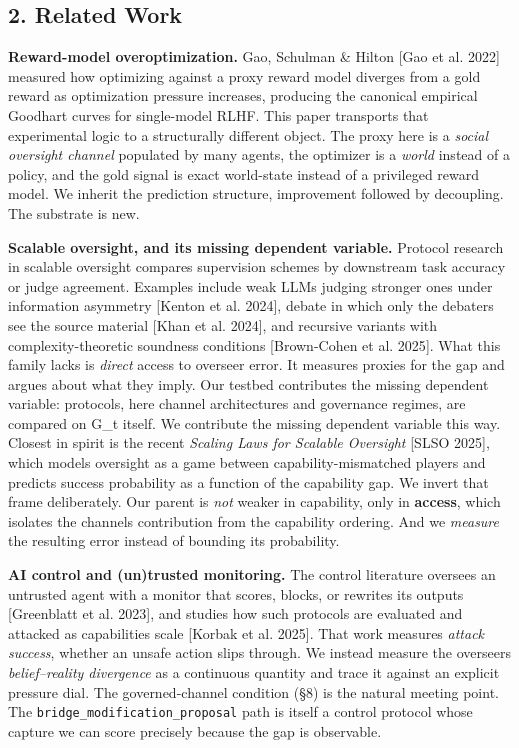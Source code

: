 \documentclass[11pt]{article}
\begin{document}
\subsection{2. Related Work}\label{2-related-work}

\textbf{Reward-model overoptimization.} Gao, Schulman \& Hilton {[}Gao
et al. 2022{]} measured how optimizing against a proxy reward model
diverges from a gold reward as optimization pressure increases,
producing the canonical empirical Goodhart curves for single-model RLHF.
This paper transports that experimental logic to a structurally
different object. The proxy here is a \emph{social oversight channel}
populated by many agents, the optimizer is a \emph{world} instead of a
policy, and the gold signal is exact world-state instead of a privileged
reward model. We inherit the prediction structure, improvement followed
by decoupling. The substrate is new.

\textbf{Scalable oversight, and its missing dependent variable.}
Protocol research in scalable oversight compares supervision schemes by
downstream task accuracy or judge agreement. Examples include weak LLMs
judging stronger ones under information asymmetry {[}Kenton et al.
2024{]}, debate in which only the debaters see the source material
{[}Khan et al. 2024{]}, and recursive variants with complexity-theoretic
soundness conditions {[}Brown-Cohen et al. 2025{]}. What this family
lacks is \emph{direct} access to overseer error. It measures proxies for
the gap and argues about what they imply. Our testbed contributes the
missing dependent variable: protocols, here channel architectures and
governance regimes, are compared on G\_t itself. We contribute the
missing dependent variable this way. Closest in spirit is the recent
\emph{Scaling Laws for Scalable Oversight} {[}SLSO 2025{]}, which models
oversight as a game between capability-mismatched players and predicts
success probability as a function of the capability gap. We invert that
frame deliberately. Our parent is \emph{not} weaker in capability, only
in \textbf{access}, which isolates the channel\textquotesingle s
contribution from the capability ordering. And we \emph{measure} the
resulting error instead of bounding its probability.

\textbf{AI control and (un)trusted monitoring.} The control literature
oversees an untrusted agent with a monitor that scores, blocks, or
rewrites its outputs {[}Greenblatt et al. 2023{]}, and studies how such
protocols are evaluated and attacked as capabilities scale {[}Korbak et
al. 2025{]}. That work measures \emph{attack success}, whether an unsafe
action slips through. We instead measure the overseer\textquotesingle s
\emph{belief--reality divergence} as a continuous quantity and trace it
against an explicit pressure dial. The governed-channel condition (§8)
is the natural meeting point. The
\texttt{bridge\_modification\_proposal} path is itself a control
protocol whose capture we can score precisely because the gap is
observable.
\end{document}
